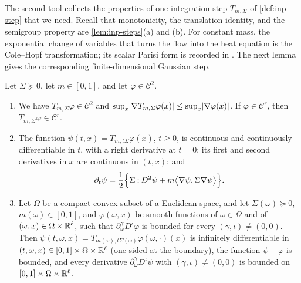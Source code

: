 The second tool collects the properties of one integration step
$T_{m,\Sigma}$ of \cref{def:inp-step} that we need. Recall that monotonicity, the
translation identity, and the semigroup property are \cref{lem:inp-steps}(a)
and (b). For constant mass, the exponential change of variables that turns
the flow into the heat equation is the Cole--Hopf transformation; its scalar
Parisi form is recorded in \cite[Section~2, (10)--(12)]{auffinger-chen-2015}.
The next lemma gives the corresponding finite-dimensional Gaussian step.

\begin{lemma}\label{lem:flow-cole-hopf}
Let $\Sigma\succeq0$, let $m\in[0,1]$, and let $\varphi\in\mathcal C^2$.
\begin{enumerate}[label=\textup{(\alph*)}]
\item We have $T_{m,\Sigma}\varphi\in\mathcal C^2$ and
 $\sup_x\lvert \nabla T_{m,\Sigma}\varphi(x)\rvert\le\sup_x\lvert \nabla\varphi(x)\rvert$. If
 $\varphi\in\mathcal C^r$, then $T_{m,\Sigma}\varphi\in\mathcal C^r$.
\item The function $\psi(t,x)=T_{m,t\Sigma}\varphi(x)$, $t\ge0$, is continuous and
 continuously differentiable in $t$, with a right derivative at $t=0$; its first
 and second derivatives in $x$ are continuous in $(t,x)$; and
 \begin{equation}\label{eq:flow-one-step-pde}
  \partial_t\psi=\frac12\Bigl\{\Sigma\mathbin{:}D^2\psi
  +m\bigl\langle\nabla\psi,\Sigma\nabla\psi\bigr\rangle\Bigr\}.
 \end{equation}
\item Let $\Omega$ be a compact convex subset of a Euclidean space, and let $\Sigma(\omega)\succeq0$,
 $m(\omega)\in[0,1]$, and $\varphi(\omega,x)$ be smooth functions of
 $\omega\in\Omega$ and of $(\omega,x)\in\Omega\times\mathbb R^\ell$, such that
 $\partial^\gamma_\omega D^\iota\varphi$ is bounded for every $(\gamma,\iota)\ne(0,0)$.
 Then $\psi(t,\omega,x)=T_{m(\omega),t\Sigma(\omega)}\varphi(\omega,\cdot)(x)$ is
 infinitely differentiable in $(t,\omega,x)\in[0,1]\times\Omega\times\mathbb R^\ell$
 (one-sided at the boundary), the function $\psi-\varphi$ is bounded, and every
 derivative $\partial^\gamma_\omega D^\iota\psi$ with $(\gamma,\iota)\ne(0,0)$ is
 bounded on $[0,1]\times\Omega\times\mathbb R^\ell$.
\end{enumerate}
\end{lemma}

